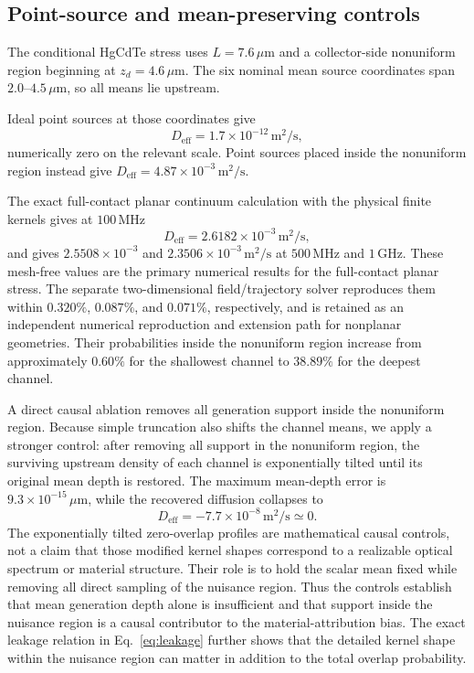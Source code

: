 \documentclass[aps,pra,twocolumn,superscriptaddress,nofootinbib]{revtex4-2}
\newcommand{\Deff}{D_{\mathrm{eff}}}
\begin{document}
\subsection{Point-source and mean-preserving controls}

The conditional HgCdTe stress uses $L=7.6\,\mu\mathrm{m}$ and a collector-side nonuniform region beginning at $z_d=4.6\,\mu\mathrm{m}$. The six nominal mean source coordinates span $2.0$--$4.5\,\mu\mathrm{m}$, so all means lie upstream.

Ideal point sources at those coordinates give
\begin{equation}
\Deff=1.7\times10^{-12}\,\mathrm{m^2/s},
\end{equation}
numerically zero on the relevant scale. Point sources placed inside the nonuniform region instead give $\Deff=4.87\times10^{-3}\,\mathrm{m^2/s}$.

The exact full-contact planar continuum calculation with the physical finite kernels gives at $100\,\mathrm{MHz}$
\begin{equation}
\Deff=2.6182\times10^{-3}\,\mathrm{m^2/s},
\label{eq:hgcdteD}
\end{equation}
and gives $2.5508\times10^{-3}$ and $2.3506\times10^{-3}\,\mathrm{m^2/s}$ at $500\,\mathrm{MHz}$ and $1\,\mathrm{GHz}$. These mesh-free values are the primary numerical results for the full-contact planar stress. The separate two-dimensional field/trajectory solver reproduces them within $0.320\%$, $0.087\%$, and $0.071\%$, respectively, and is retained as an independent numerical reproduction and extension path for nonplanar geometries.
Their probabilities inside the nonuniform region increase from approximately $0.60\%$ for the shallowest channel to $38.89\%$ for the deepest channel.

A direct causal ablation removes all generation support inside the nonuniform region. Because simple truncation also shifts the channel means, we apply a stronger control: after removing all support in the nonuniform region, the surviving upstream density of each channel is exponentially tilted until its original mean depth is restored. The maximum mean-depth error is $9.3\times10^{-15}\,\mu\mathrm{m}$, while the recovered diffusion collapses to
\begin{equation}
\Deff=-7.7\times10^{-8}\,\mathrm{m^2/s}\simeq0.
\end{equation}
The exponentially tilted zero-overlap profiles are mathematical causal controls, not a claim that those modified kernel shapes correspond to a realizable optical spectrum or material structure.  Their role is to hold the scalar mean fixed while removing all direct sampling of the nuisance region.
Thus the controls establish that mean generation depth alone is insufficient and that support inside the nuisance region is a causal contributor to the material-attribution bias.  The exact leakage relation in Eq.~\eqref{eq:leakage} further shows that the detailed kernel shape within the nuisance region can matter in addition to the total overlap probability.
\end{document}
